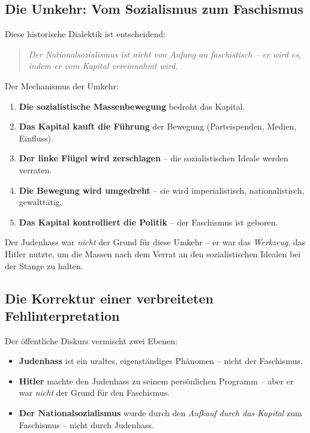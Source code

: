\subsection{Die Umkehr: Vom Sozialismus zum Faschismus}

Diese historische Dialektik ist entscheidend:

\begin{quote}
\emph{Der Nationalsozialismus ist nicht von Anfang an faschistisch – er wird es, indem er vom Kapital vereinnahmt wird.}
\end{quote}

Der Mechanismus der Umkehr:

\begin{enumerate}
    \item \textbf{Die sozialistische Massenbewegung} bedroht das Kapital.
    \item \textbf{Das Kapital kauft die Führung} der Bewegung (Parteispenden, Medien, Einfluss).
    \item \textbf{Der linke Flügel wird zerschlagen} – die sozialistischen Ideale werden verraten.
    \item \textbf{Die Bewegung wird umgedreht} – sie wird imperialistisch, nationalistisch, gewalttätig.
    \item \textbf{Das Kapital kontrolliert die Politik} – der Faschismus ist geboren.
\end{enumerate}

Der Judenhass war \emph{nicht} der Grund für diese Umkehr – er war das \emph{Werkzeug}, das Hitler nutzte, um die Massen nach dem Verrat an den sozialistischen Idealen bei der Stange zu halten.

\subsection{Die Korrektur einer verbreiteten Fehlinterpretation}

Der öffentliche Diskurs vermischt zwei Ebenen:

\begin{itemize}
    \item \textbf{Judenhass} ist ein uraltes, eigenständiges Phänomen – nicht der Faschismus.
    \item \textbf{Hitler} machte den Judenhass zu seinem persönlichen Programm – aber er war \emph{nicht} der Grund für den Faschismus.
    \item \textbf{Der Nationalsozialismus} wurde durch den \emph{Aufkauf durch das Kapital} zum Faschismus – nicht durch Judenhass.
\end{itemize}

